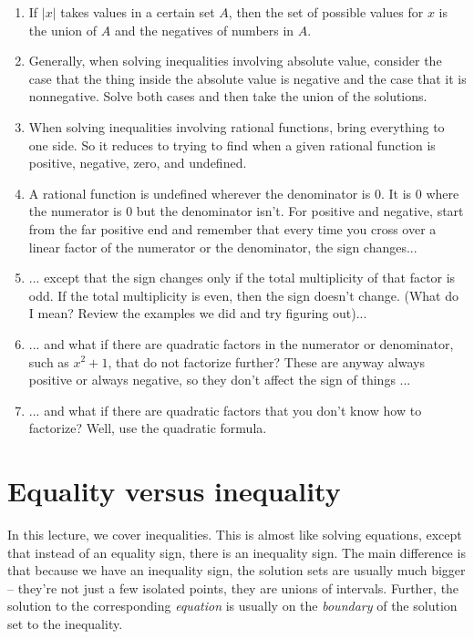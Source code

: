 \documentclass{amsart}
\begin{document}
\begin{enumerate}
\item If $|x|$ takes values in a certain set $A$, then the set of
  possible values for $x$ is the union of $A$ and the negatives of
  numbers in $A$.
\item Generally, when solving inequalities involving absolute value,
  consider the case that the thing inside the absolute value is
  negative and the case that it is nonnegative. Solve both cases and
  then take the union of the solutions.
\item When solving inequalities involving rational functions, bring
  everything to one side. So it reduces to trying to find when a given
  rational function is positive, negative, zero, and undefined.
\item A rational function is undefined wherever the denominator is
  $0$. It is $0$ where the numerator is $0$ but the denominator
  isn't. For positive and negative, start from the far positive end
  and remember that every time you cross over a linear factor of the
  numerator or the denominator, the sign changes...
\item ... except that the sign changes only if the total multiplicity
  of that factor is odd. If the total multiplicity is even, then the
  sign doesn't change. (What do I mean? Review the examples we did and
  try figuring out)...
\item ... and what if there are quadratic factors in the numerator or
  denominator, such as $x^2 + 1$, that do not factorize further? These
  are anyway always positive or always negative, so they don't affect
  the sign of things ...
\item ... and what if there are quadratic factors that you don't know
  how to factorize? Well, use the quadratic formula.
\end{enumerate}

\section{Equality versus inequality}

In this lecture, we cover inequalities. This is almost like solving
equations, except that instead of an equality sign, there is an
inequality sign. The main difference is that because we have an
inequality sign, the solution sets are usually much bigger -- they're
not just a few isolated points, they are unions of intervals. Further,
the solution to the corresponding {\em equation} is usually on the
{\em boundary} of the solution set to the inequality.
\end{document}
